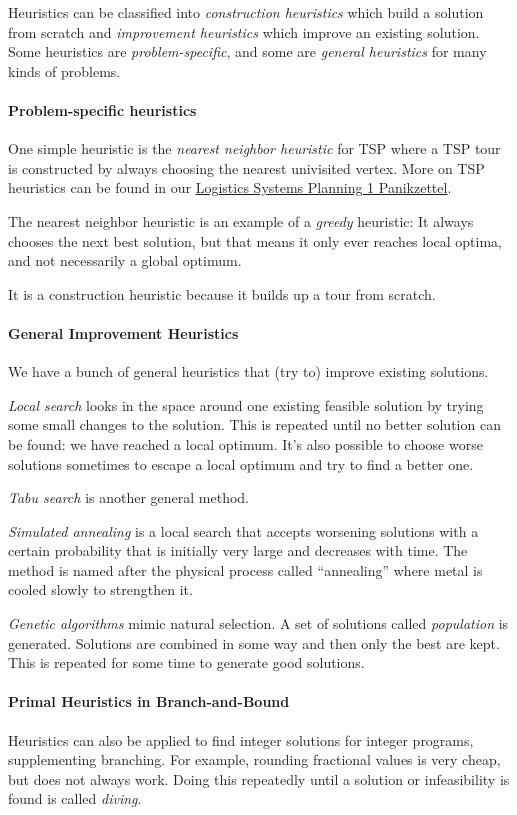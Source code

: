 \documentclass[english]{panikzettel}
\begin{document}
Heuristics can be classified into \emph{construction heuristics} which build a solution from scratch and \emph{improvement heuristics} which improve an existing solution.
Some heuristics are \emph{problem-specific}, and some are \emph{general heuristics} for many kinds of problems.

\paragraph{Problem-specific heuristics}
One simple heuristic is the \emph{nearest neighbor heuristic} for TSP where a TSP tour is constructed by always choosing the nearest univisited vertex.
More on TSP heuristics can be found in our \href{https://panikzettel.philworld.de/lsp1.pdf}{Logistics Systems Planning 1 Panikzettel}.

The nearest neighbor heuristic is an example of a \emph{greedy} heuristic: It always chooses the next best solution, but that means it only ever reaches local optima, and not necessarily a global optimum.

It is a construction heuristic because it builds up a tour from scratch.

\paragraph{General Improvement Heuristics}
We have a bunch of general heuristics that (try to) improve existing solutions.

\emph{Local search} looks in the space around one existing feasible solution by trying some small changes to the solution.
This is repeated until no better solution can be found: we have reached a local optimum.
It's also possible to choose worse solutions sometimes to escape a local optimum and try to find a better one.

\emph{Tabu search} is another general method.

\emph{Simulated annealing} is a local search that accepts worsening solutions with a certain probability that is initially very large and decreases with time.
The method is named after the physical process called ``annealing'' where metal is cooled slowly to strengthen it.

\emph{Genetic algorithms} mimic natural selection.
A set of solutions called \emph{population} is generated.
Solutions are combined in some way and then only the best are kept.
This is repeated for some time to generate good solutions.

\paragraph{Primal Heuristics in Branch-and-Bound}
Heuristics can also be applied to find integer solutions for integer programs, supplementing branching.
For example, rounding fractional values is very cheap, but does not always work.
Doing this repeatedly until a solution or infeasibility is found is called \emph{diving}.
\end{document}
